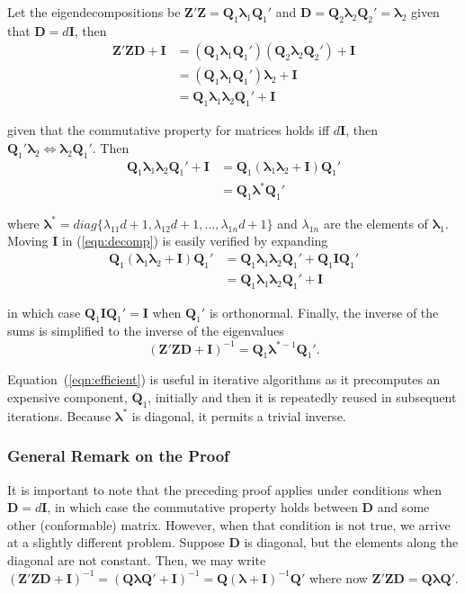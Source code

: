 \documentclass[12pt]{article}
\begin{document}
Let the eigendecompositions be $\bm{Z}'\bm{Z} = \bm{Q}_1 \bm{\lambda}_1 \bm{Q}_1'$ and $\bm{D}=\bm{Q}_2 \bm{\lambda}_2 \bm{Q}_2'= \bm{\lambda}_2$ given that $\bm{D}=d\bm{I}$, then
\begin{align}
\bm{Z}'\bm{Z}\bm{D} + \bm{I} & = (\bm{Q}_1 \bm{\lambda}_1 \bm{Q}_1')(\bm{Q}_2 \bm{\lambda}_2 \bm{Q}_2') + \bm{I}\\
		& = (\bm{Q}_1 \bm{\lambda}_1 \bm{Q}_1')\bm{\lambda}_2 + \bm{I}\\
		&= \bm{Q}_1 \bm{\lambda}_1\bm{\lambda}_2 \bm{Q}_1' + \bm{I}
\end{align}

\noindent given that the commutative property for matrices holds iff $d\bm{I}$, then $\bm{Q}_1'\bm{\lambda}_2 \Longleftrightarrow \bm{\lambda}_2\bm{Q}_1'$. Then
\begin{align}
\bm{Q}_1 \bm{\lambda}_1\bm{\lambda}_2 \bm{Q}_1' + \bm{I}	&= \bm{Q}_1 (\bm{\lambda}_1\bm{\lambda}_2+ \bm{I}) \bm{Q}_1' \label{eqn:decomp}\\
		&= \bm{Q}_1 \bm{\lambda}^* \bm{Q}_1'
\end{align}

\noindent where $\bm{\lambda}^* = diag\{\lambda_{11}d+1, \lambda_{12}d+1, \ldots, \lambda_{1n}d+1\}$ and $\lambda_{1n}$ are the elements of $\bm{\lambda}_1$. Moving $\bm{I}$ in (\ref{eqn:decomp}) is easily verified by expanding
\begin{align}
\bm{Q}_1 (\bm{\lambda}_1\bm{\lambda}_2 + \bm{I}) \bm{Q}_1' &= \bm{Q}_1 \bm{\lambda}_1\bm{\lambda}_2\bm{Q}_1' + \bm{Q}_1\bm{I}\bm{Q}_1'\\
		&=\bm{Q}_1 \bm{\lambda}_1\bm{\lambda}_2\bm{Q}_1' + \bm{I}
\end{align}

\noindent in which case $\bm{Q}_1\bm{I}\bm{Q}_1'=\bm{I}$ when $\bm{Q}_1'$ is orthonormal. Finally, the inverse of the sums is simplified to the inverse of the eigenvalues 
\begin{equation}
\label{eqn:efficient}
(\bm{Z}'\bm{Z}\bm{D} + \bm{I})^{-1} = \bm{Q}_1 \bm{\lambda}^{*-1} \bm{Q}_1'.
\end{equation}

Equation~(\ref{eqn:efficient}) is useful in iterative algorithms as it precomputes an expensive component, $\bm{Q}_1$, initially and then it is repeatedly reused in subsequent iterations. Because $\bm{\lambda}^*$ is diagonal, it permits a trivial inverse. 

\subsubsection*{General Remark on the Proof}
It is important to note that the preceding proof applies under conditions when $\bm{D}=d\bm{I}$, in which case the commutative property holds between $\bm{D}$ and some other (conformable) matrix. However, when that condition is not true, we arrive at a slightly different problem. Suppose $\bm{D}$ is diagonal, but the elements along the diagonal are not constant. Then, we may write $(\bm{Z}'\bm{Z}\bm{D} + \bm{I})^{-1} = (\bm{Q} \bm{\lambda} \bm{Q}' + \bm{I})^{-1} = \bm{Q} (\bm{\lambda}+\bm{I})^{-1} \bm{Q}'$ where now $\bm{Z}'\bm{Z}\bm{D} = \bm{Q} \bm{\lambda} \bm{Q}'$.
\end{document}
